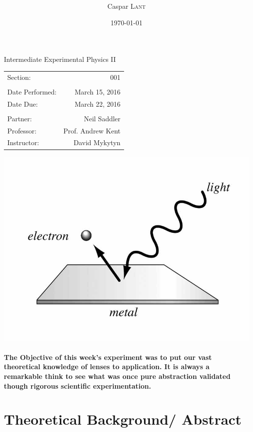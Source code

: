 \documentclass{amsart}
\title{      }
\author{Caspar \textsc{Lant}} %
\date{\today} %
\begin{document}
\bigskip

\maketitle %
\begin{center}

Intermediate Experimental Physics II\\
\vspace{1.5cm}

\begin{tabular}{l r}

Section: & 001\\
\\
Date Performed: & March 15, 2016 \\ %
Date Due: & March 22, 2016\\
\\
Partner: & Neil Saddler\\ %
Professor: & Prof. Andrew Kent\\
Instructor: & David Mykytyn %
\end{tabular}
\vfill
\includegraphics[width=.7\textwidth]{diagram.jpg}
\end{center}
\vfill
\pagebreak

\paragraph{\textbf{The Objective} of this week's experiment was to put our vast theoretical knowledge of lenses to application. It is always a remarkable think to see what was once pure abstraction validated though rigorous scientific experimentation. }

\section{Theoretical Background/ Abstract}
\end{document}
